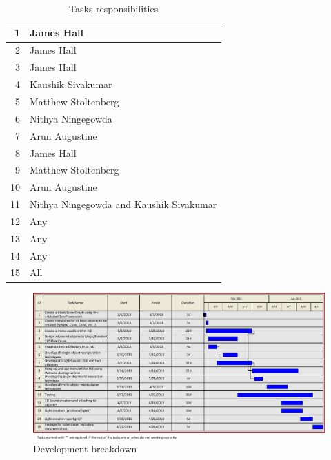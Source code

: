 \begin{table}
	\begin{tabular}{|r||l|}
		\hline
		1 & James Hall \\ \hline
		2 & James Hall \\ \hline
		3 & James Hall \\ \hline
		4 & Kaushik Sivakumar \\ \hline
		5 & Matthew Stoltenberg \\ \hline
		6 & Nithya Ningegowda \\ \hline
		7 & Arun Augustine \\ \hline
		8	& James Hall \\ \hline
		9 & Matthew Stoltenberg \\ \hline
		10 & Arun Augustine \\ \hline
		11 & Nithya Ningegowda and Kaushik Sivakumar \\ \hline
		12 & Any \\ \hline
		13 & Any \\ \hline
		14 & Any \\ \hline
		15 & All \\ \hline
	\end{tabular}
	\caption{Tasks responsibilities}
	\label{tab:responsibilities}
\end{table}

\begin{landscape}
	\begin{figure}[htbp]
		\includegraphics{figs/gantt_chart.pdf}
		\caption{Development breakdown}
		\label{fig:gantt}
	\end{figure}
\end{landscape}
